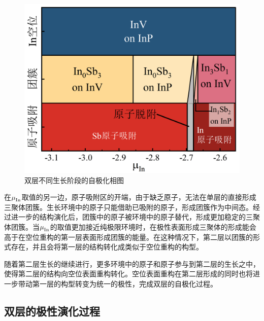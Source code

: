 \begin{figure}[!htb]
    \includegraphics{pic/IS_DFT_stagePhase.png}
    \caption{双层不同生长阶段的自极化相图}
    \label{fig:IS_DFT_stagePhase}
\end{figure}

在$\it \mu_{\rm In}^{\rm } \it$取值的另一边，原子吸附区的开端，由于缺乏原子，无法在单层的直接形成三聚体团簇。生长环境中的原子只能借助已吸附的原子，形成团簇作为中间态。经过进一步的结构演化后，团簇中的原子被环境中的原子替代，形成更加稳定的三聚体团簇。当$\it \mu_{\rm In}^{\rm } \it$的取值更加接近纯极限环境时，在极性表面形成三聚体的形成能会高于在空位重构的第一层表面形成团簇的能量。在这种情况下，第二层以团簇的形式存在，并且会将第一层的结构转化成类似于空位重构的构型。

随着第二层生长的继续进行，更多环境中的原子和原子参与到第二层的生长之中，使得第二层的结构向空位表面重构转化。空位表面重构在第二层形成的同时也将进一步带动第一层的构型转变为统一的极性，完成双层的自极化过程。

\subsection{双层的极性演化过程}

